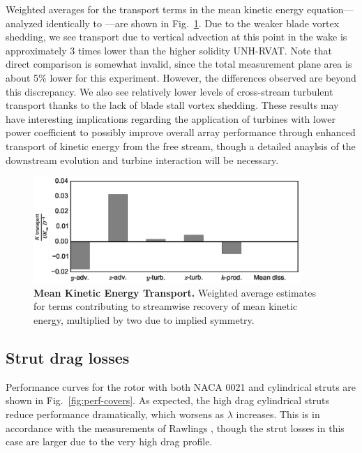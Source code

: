 \documentclass[10pt,letterpaper]{article}
\begin{document}
Weighted averages for the transport terms in the mean kinetic energy
equation---analyzed identically to \cite{Bachant2015-JoT}---are shown in
Fig.~\ref{fig:Ktransport}. Due to the weaker blade vortex shedding, we see
transport due to vertical advection at this point in the wake is approximately 3
times lower than the higher solidity UNH-RVAT. Note that direct comparison is
somewhat invalid, since the total measurement plane area is about 5\% lower for
this experiment. However, the differences observed are beyond this discrepancy.
We also see relatively lower levels of cross-stream turbulent transport thanks
to the lack of blade stall vortex shedding. These results may have interesting
implications regarding the application of turbines with lower power coefficient
to possibly improve overall array performance through enhanced transport of
kinetic energy from the free stream, though a detailed anaylsis of the
downstream evolution and turbine interaction will be necessary.

\begin{figure}[ht!]
    \includegraphics[width=0.9\textwidth]{figures/K_trans_bar_graph.eps}

    \caption{{\bf Mean Kinetic Energy Transport.} Weighted average estimates for
    terms contributing to streamwise recovery of mean kinetic energy, multiplied
    by two due to implied symmetry.}

    \label{fig:Ktransport}
\end{figure}


\subsection*{Strut drag losses}

Performance curves for the rotor with both NACA 0021 and cylindrical struts are
shown in Fig.~\ref{fig:perf-covers}. As expected, the high drag cylindrical
struts reduce performance dramatically, which worsens as $\lambda$ increases.
This is in accordance with the measurements of Rawlings \cite{Rawlings2008},
though the strut losses in this case are larger due to the very high drag profile.
\end{document}
